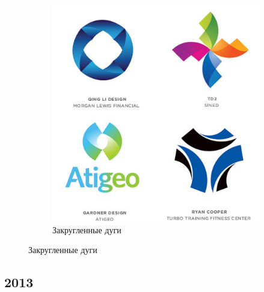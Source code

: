 \begin{figure}[h!]
  \vfill

  \centering
  \begin{subfigure}{.45\textwidth}
    \centering
    \includegraphics[width=\linewidth]{images/supplement/logolounge/2012/Zakruxhennie-dugi.jpeg}
    \caption{Закругленные дуги}
    \label{fig:logolounge:2012:zakruxhennie-dugi}
  \end{subfigure}
\end{figure}


\FloatBarrier
\subsection{2013}

